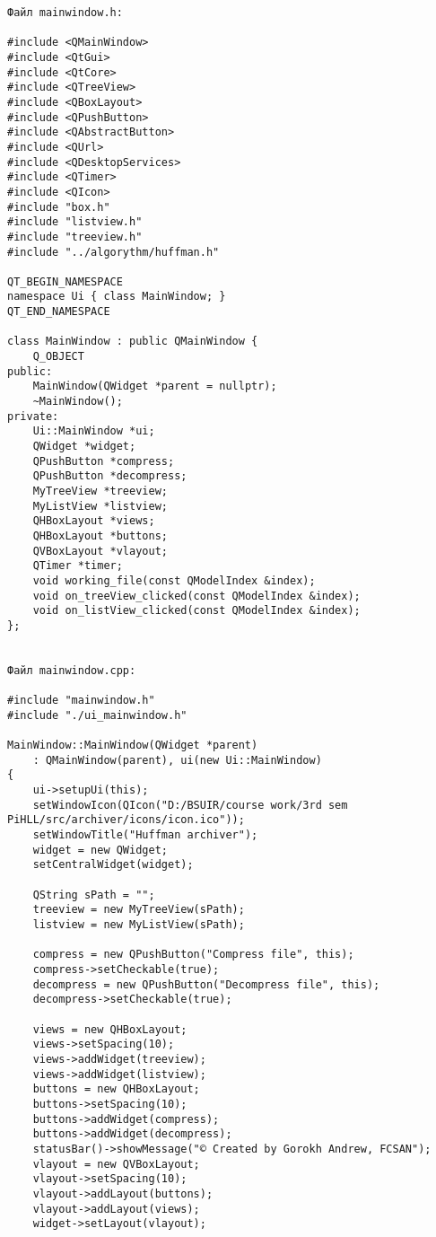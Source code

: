 \begin{verbatim}
Файл mainwindow.h:

#include <QMainWindow>
#include <QtGui>
#include <QtCore>
#include <QTreeView>
#include <QBoxLayout>
#include <QPushButton>
#include <QAbstractButton>
#include <QUrl>
#include <QDesktopServices>
#include <QTimer>
#include <QIcon>
#include "box.h"
#include "listview.h"
#include "treeview.h"
#include "../algorythm/huffman.h"

QT_BEGIN_NAMESPACE
namespace Ui { class MainWindow; }
QT_END_NAMESPACE

class MainWindow : public QMainWindow {
    Q_OBJECT
public:
    MainWindow(QWidget *parent = nullptr);
    ~MainWindow();
private:
    Ui::MainWindow *ui;
    QWidget *widget;
    QPushButton *compress;
    QPushButton *decompress;
    MyTreeView *treeview;
    MyListView *listview;
    QHBoxLayout *views;
    QHBoxLayout *buttons;
    QVBoxLayout *vlayout;
    QTimer *timer;
    void working_file(const QModelIndex &index);
    void on_treeView_clicked(const QModelIndex &index);
    void on_listView_clicked(const QModelIndex &index);
};


Файл mainwindow.cpp:

#include "mainwindow.h"
#include "./ui_mainwindow.h"

MainWindow::MainWindow(QWidget *parent)
    : QMainWindow(parent), ui(new Ui::MainWindow)
{
    ui->setupUi(this);
    setWindowIcon(QIcon("D:/BSUIR/course work/3rd sem PiHLL/src/archiver/icons/icon.ico"));
    setWindowTitle("Huffman archiver");
    widget = new QWidget;
    setCentralWidget(widget);

    QString sPath = "";
    treeview = new MyTreeView(sPath);
    listview = new MyListView(sPath);

    compress = new QPushButton("Compress file", this);
    compress->setCheckable(true);
    decompress = new QPushButton("Decompress file", this);
    decompress->setCheckable(true);

    views = new QHBoxLayout;
    views->setSpacing(10);
    views->addWidget(treeview);
    views->addWidget(listview);
    buttons = new QHBoxLayout;
    buttons->setSpacing(10);
    buttons->addWidget(compress);
    buttons->addWidget(decompress);
    statusBar()->showMessage("© Created by Gorokh Andrew, FCSAN");
    vlayout = new QVBoxLayout;
    vlayout->setSpacing(10);
    vlayout->addLayout(buttons);
    vlayout->addLayout(views);
    widget->setLayout(vlayout);
    

\end{verbatim}
